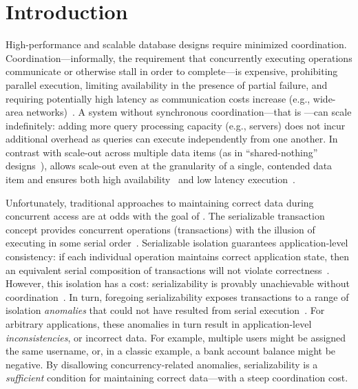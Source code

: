 
\section{Introduction}
\label{sec:intro}


High-performance and scalable database designs require minimized
coordination. Coordination---informally, the requirement that
concurrently executing operations communicate or otherwise stall in
order to complete---is expensive, prohibiting parallel execution,
limiting availability in the presence of partial failure, and
requiring potentially high latency as communication costs increase
(e.g., wide-area networks)~\cite{hat-vldb,gilbert-cap}. A system
without synchronous coordination---that is \textit{\cfree}---can scale
indefinitely: adding more query processing capacity (e.g., servers)
does not incur additional overhead as queries can execute
independently from one another. In contrast with scale-out across
multiple data items (as in ``shared-nothing''
designs~\cite{bernstein-book,f1,spanner,pnuts,hstore}), \cfreedom
allows scale-out even at the granularity of a single, contended data
item and ensures both high availability~\cite{gilbert-cap} and low
latency execution~\cite{pacelc}.


Unfortunately, traditional approaches to maintaining correct data
during concurrent access are at odds with the goal of \cfreedom. The
serializable transaction concept provides concurrent operations
(transactions) with the illusion of executing in some serial
order~\cite{bernstein-book}. Serializable isolation guarantees
application-level consistency: if each individual operation maintains
correct application state, then an equivalent serial composition of
transactions will not violate
correctness~\cite{gray-virtues}. However, this isolation has a cost:
serializability is provably unachievable without
coordination~\cite{hat-vldb,davidson-survey}. In turn, foregoing
serializability exposes transactions to a range of isolation
\textit{anomalies} that could not have resulted from serial
execution~\cite{adya-isolation}. For arbitrary applications, these
anomalies in turn result in application-level
\textit{inconsistencies}, or incorrect data. For example, multiple
users might be assigned the same username, or, in a classic example, a
bank account balance might be negative. By disallowing
concurrency-related anomalies, serializability is a
\textit{sufficient} condition for maintaining correct data---with a
steep coordination cost.


